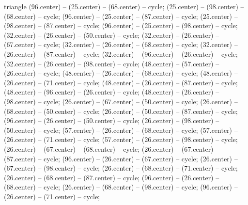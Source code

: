 \begin{pgfonlayer}{triangle}
 (96.center) -- (25.center) -- (68.center) -- cycle; 
 (25.center) -- (98.center) -- (68.center) -- cycle; 
 (96.center) -- (25.center) -- (87.center) -- cycle; 
 (25.center) -- (98.center) -- (87.center) -- cycle; 
 (96.center) -- (25.center) -- (98.center) -- cycle; 
 (32.center) -- (26.center) -- (50.center) -- cycle; 
 (32.center) -- (26.center) -- (67.center) -- cycle; 
 (32.center) -- (26.center) -- (68.center) -- cycle; 
 (32.center) -- (26.center) -- (87.center) -- cycle; 
 (32.center) -- (96.center) -- (26.center) -- cycle; 
 (32.center) -- (26.center) -- (98.center) -- cycle; 
 (48.center) -- (57.center) -- (26.center) -- cycle; 
 (48.center) -- (26.center) -- (68.center) -- cycle; 
 (48.center) -- (26.center) -- (71.center) -- cycle; 
 (48.center) -- (26.center) -- (87.center) -- cycle; 
 (48.center) -- (96.center) -- (26.center) -- cycle; 
 (48.center) -- (26.center) -- (98.center) -- cycle; 
 (26.center) -- (67.center) -- (50.center) -- cycle; 
 (26.center) -- (68.center) -- (50.center) -- cycle; 
 (26.center) -- (50.center) -- (87.center) -- cycle; 
 (96.center) -- (26.center) -- (50.center) -- cycle; 
 (26.center) -- (98.center) -- (50.center) -- cycle; 
 (57.center) -- (26.center) -- (68.center) -- cycle; 
 (57.center) -- (26.center) -- (71.center) -- cycle; 
 (57.center) -- (26.center) -- (98.center) -- cycle; 
 (26.center) -- (67.center) -- (68.center) -- cycle; 
 (26.center) -- (67.center) -- (87.center) -- cycle; 
 (96.center) -- (26.center) -- (67.center) -- cycle; 
 (26.center) -- (67.center) -- (98.center) -- cycle; 
 (26.center) -- (68.center) -- (71.center) -- cycle; 
 (26.center) -- (68.center) -- (87.center) -- cycle; 
 (96.center) -- (26.center) -- (68.center) -- cycle; 
 (26.center) -- (68.center) -- (98.center) -- cycle; 
 (96.center) -- (26.center) -- (71.center) -- cycle; 

\end{pgfonlayer}
